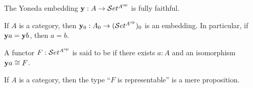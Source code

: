 \documentclass[hott-all.tex]{subfiles}
\begin{document}
\begin{cor}\label{ct:yoneda-embedding}
  The Yoneda embedding $\mathbf{y} :A\to \mathcal{S}et^{A^{\mathrm{op}}}$ is fully faithful.
\end{cor}

\begin{cor}\label{ct:yoneda-mono}
  If $A$ is a category, then $\mathbf{y}_0 : A_0 \to (\mathcal{S}et^{A^{\mathrm{op}}})_0$ is an embedding.
  In particular, if $\mathbf{y} a = \mathbf{y} b$, then $a=b$.
\end{cor}

\begin{defn}\label{ct:representable}
  A functor $F:\mathcal{S}et^{A^{\mathrm{op}}}$ is said to be 
  if there exists $a:A$ and an isomorphism $\mathbf{y} a \cong F$.
\end{defn}

\begin{thm}\label{ct:representable-prop}
  If $A$ is a category, then the type ``$F$ is representable'' is a mere proposition.
\end{thm}
%
\end{document}
